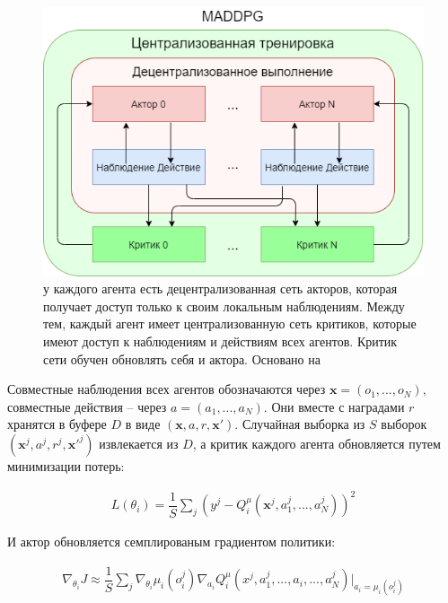 \begin{figure}[ht!]
    \center
    \includegraphics [scale=0.80] {my_folder/images/ch2/maddpg.png}
    \caption{у каждого агента есть децентрализованная сеть акторов, которая получает доступ только к своим локальным наблюдениям. Между тем, каждый агент имеет централизованную сеть критиков, которые имеют доступ к наблюдениям и действиям всех агентов. Критик сети обучен обновлять себя и актора. Основано на \cite{lowe2017multiagent}}
    \label{fig:ch2-maddpg}
\end{figure}

Совместные наблюдения всех агентов обозначаются через $\mathbf{x} = (o_1, ..., o_N)$, совместные действия -- через $a = (a_1, ..., a_N)$. Они вместе с наградами $r$ хранятся в буфере $D$ в виде $(\mathbf{x}, a, r, \mathbf{x}')$. Случайная выборка из $S$ выборок $(\mathbf{x}^j, a^j, r^j, \mathbf{x}'^j)$ извлекается из $D$, а критик каждого агента обновляется путем минимизации потерь:

\begin{equation}
    \begin{multlined}
        L(\theta_i) = \dfrac{1}{S} \sum_j (y^j - Q_{i}^\mu (\mathbf x^j, a_{1}^j, ...,a_{N}^j))^2
    \end{multlined}
\end{equation}

И актор обновляется семплированым градиентом политики:

\begin{equation}
    \begin{multlined}
        \nabla_{\theta_i} J \approx \dfrac{1}{S} \sum_j \nabla_{\theta_i} \mu_i (o^j_i) \nabla_{a_i} Q^\mu_i (x^j, a^j_1, ..., a_i, ..., a^j_N)|_{a_i=\mu_i(o^j_i)}
    \end{multlined}
\end{equation}


